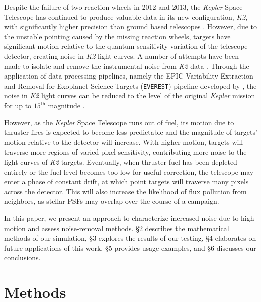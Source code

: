 \documentclass[12pt,preprint]{aastex}
\begin{document}
Despite the failure of two reaction wheels in 2012 and 2013, the \textit{Kepler} Space Telescope has continued to produce valuable data in its new configuration, \textit{K2}, with significantly higher precision than ground based telescopes \citep{2014PASP..126..398H}. However, due to the unstable pointing caused by the missing reaction wheels, targets have significant motion relative to the quantum sensitivity variation of the telescope detector, creating noise in \textit{K2} light curves. A number of attempts have been made to isolate and remove the instrumental noise from \textit{K2} data \citep{2014PASP..126..948V,2015A&A...579A..19A, 0004-637X-806-1-30, 2015MNRAS.454.4159H, 2015MNRAS.447.2880A, 2016MNRAS.459.2408A}. Through the application of data processing pipelines, namely the EPIC Variability Extraction and Removal for Exoplanet Science Targets (\texttt{EVEREST}) pipeline developed by \cite{2016AJ....152..100L}, the noise in \textit{K2} light curves can be reduced to the level of the original \textit{Kepler} mission for up to $15^{\text{th}}$ magnitude \citep{2017arXiv170205488L}.

However, as the \textit{Kepler} Space Telescope runs out of fuel, its motion due to thruster fires is expected to become less predictable and the magnitude of targets' motion relative to the detector will increase. With higher motion, targets will traverse more regions of varied pixel sensitivity, contributing more noise to the light curves of \textit{K2} targets. Eventually, when thruster fuel has been depleted entirely or the fuel level becomes too low for useful correction, the telescope may enter a phase of constant drift, at which point targets will traverse many pixels across the detector. This will also increase the likelihood of flux pollution from neighbors, as stellar PSFs may overlap over the course of a campaign.

In this paper, we present an approach to characterize increased noise due to high motion and assess noise-removal methods. \S 2 describes the mathematical methods of our simulation, \S 3 explores the results of our testing, \S 4 elaborates on future applications of this work, \S 5 provides usage examples, and \S 6 discusses our conclusions.

\section{Methods}
\end{document}

